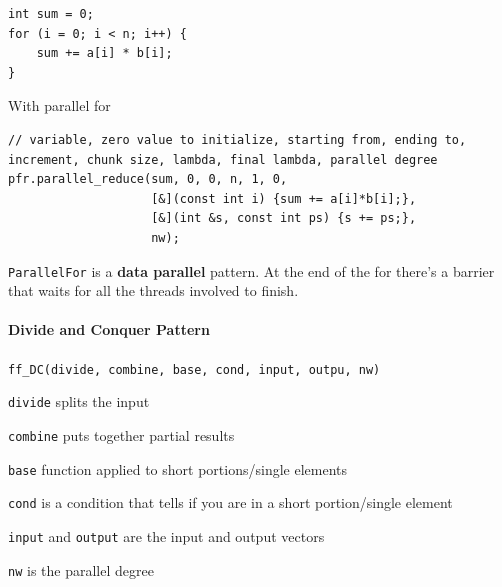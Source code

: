 \documentclass[10pt]{report}
\begin{document}
\begin{lstlisting}[style=myC]
int sum = 0;
for (i = 0; i < n; i++) {
	sum += a[i] * b[i];
}
\end{lstlisting}
With parallel for
\begin{lstlisting}[style=myC]
// variable, zero value to initialize, starting from, ending to, increment, chunk size, lambda, final lambda, parallel degree
pfr.parallel_reduce(sum, 0, 0, n, 1, 0,
					[&](const int i) {sum += a[i]*b[i];},
					[&](int &s, const int ps) {s += ps;},
					nw);
\end{lstlisting}
\texttt{ParallelFor} is a \textbf{data parallel} pattern. At the end of the for there's a barrier that waits for all the threads involved to finish.
\paragraph{Divide and Conquer Pattern} \texttt{ff\_DC(divide, combine, base, cond, input, outpu, nw)}
\begin{list}{}{}
	\item \texttt{divide} splits the input
	\item \texttt{combine} puts together partial results
	\item \texttt{base} function applied to short portions/single elements
	\item \texttt{cond} is a condition that tells if you are in a short portion/single element
	\item \texttt{input} and \texttt{output} are the input and output vectors
	\item \texttt{nw} is the parallel degree
\end{list}
\end{document}
